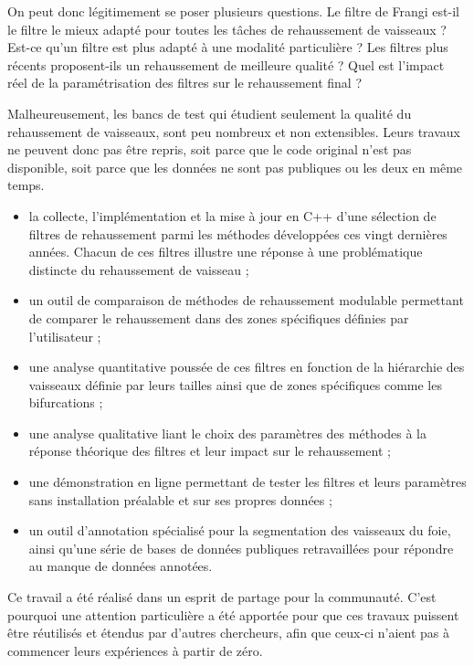 On peut donc légitimement se poser plusieurs questions. Le filtre de Frangi est-il le filtre le mieux adapté pour toutes les tâches de rehaussement de vaisseaux ? Est-ce qu'un filtre est plus adapté à une modalité particulière ? Les filtres plus récents proposent-ils un rehaussement de meilleure qualité ? Quel est l'impact réel de la paramétrisation des filtres sur le rehaussement final ? 

Malheureusement, les bancs de test qui étudient seulement la qualité du rehaussement de vaisseaux,  sont peu nombreux et non extensibles. Leurs travaux ne peuvent donc pas être repris, soit parce que le code original n'est pas disponible, soit parce que les données ne sont pas publiques ou les deux en même temps. 

\begin{itemize}
\item la collecte, l'implémentation et la mise à jour en C++ d'une sélection de filtres de rehaussement parmi les méthodes développées ces vingt dernières années. Chacun de ces filtres illustre une réponse à une problématique distincte du rehaussement de vaisseau ;
\item un outil de comparaison de méthodes de rehaussement modulable permettant de comparer le rehaussement dans des zones spécifiques définies par l'utilisateur ;
\item une analyse quantitative poussée de ces filtres en fonction de la hiérarchie des vaisseaux définie par leurs tailles ainsi que de zones spécifiques comme les bifurcations ;
\item une analyse qualitative liant le choix des paramètres des méthodes à la réponse théorique des filtres et leur impact sur le rehaussement ;
\item une démonstration en ligne permettant de tester les filtres et leurs paramètres sans installation préalable et sur ses propres données ;
\item un outil d'annotation spécialisé pour la segmentation des vaisseaux du foie, ainsi qu'une série de bases de données publiques retravaillées pour répondre au manque de données annotées.
\end{itemize}

Ce travail a été réalisé dans un esprit de partage pour la communauté. C'est pourquoi une attention particulière a été apportée pour que ces travaux puissent être réutilisés et étendus par d'autres chercheurs, afin que ceux-ci n'aient pas à commencer leurs expériences à partir de zéro.


